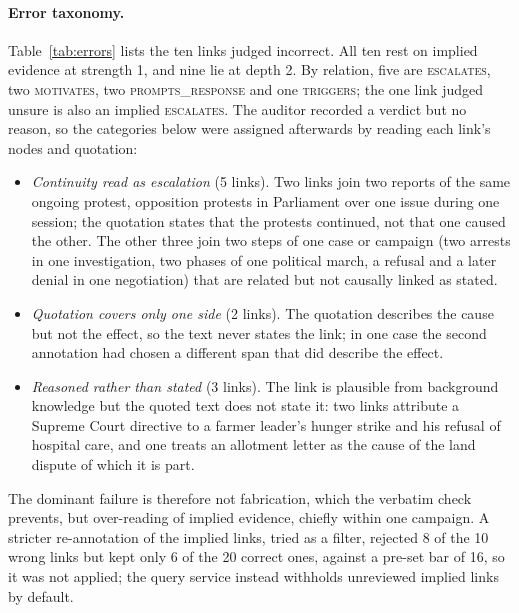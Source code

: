 \documentclass[pdflatex,sn-basic,lineno]{sn-jnl}
\theoremstyle{thmstylethree}
\theoremstyle{thmstyleone}
\newcommand{\rel}[1]{\textsc{#1}}
\begin{document}
\paragraph{Error taxonomy.} Table~\ref{tab:errors} lists the ten links judged incorrect. All ten
rest on implied evidence at strength 1, and nine lie at depth 2. By relation, five are
\rel{escalates}, two \rel{motivates}, two \rel{prompts\_response} and one \rel{triggers}; the one
link judged unsure is also an implied \rel{escalates}. The auditor recorded a verdict but no reason,
so the categories below were assigned afterwards by reading each link's nodes and quotation:
\begin{itemize}
\item \emph{Continuity read as escalation} (5 links). Two links join two reports of the same
ongoing protest, opposition protests in Parliament over one issue during one session; the
quotation states that the protests continued, not that one caused the other. The other three join
two steps of one case or campaign (two arrests in one investigation, two phases of one political
march, a refusal and a later denial in one negotiation) that are related but not causally linked
as stated.
\item \emph{Quotation covers only one side} (2 links). The quotation describes the cause but not
the effect, so the text never states the link; in one case the second annotation had chosen a
different span that did describe the effect.
\item \emph{Reasoned rather than stated} (3 links). The link is plausible from background
knowledge but the quoted text does not state it: two links attribute a Supreme Court directive to
a farmer leader's hunger strike and his refusal of hospital care, and one treats an allotment
letter as the cause of the land dispute of which it is part.
\end{itemize}
The dominant failure is therefore not fabrication, which the verbatim check prevents, but
over-reading of implied evidence, chiefly within one campaign. A stricter re-annotation of the
implied links, tried as a filter, rejected 8 of the 10 wrong links but kept only 6 of the 20
correct ones, against a pre-set bar of 16, so it was not applied; the query service instead
withholds unreviewed implied links by default.
\end{document}
